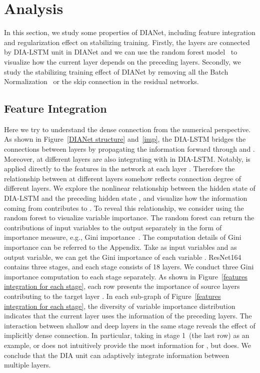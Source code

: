 \documentclass[letterpaper]{article} \usepackage{aaai20}  \usepackage{times}  \usepackage{helvet} \usepackage{courier}  \usepackage[hyphens]{url}  \usepackage{graphicx} \urlstyle{rm} \def\UrlFont{\rm}  \usepackage{graphicx}  \frenchspacing  \setlength{\pdfpagewidth}{8.5in}  \setlength{\pdfpageheight}{11in}  \usepackage{color}
\begin{document}
	\section{Analysis}
	\label{analysis}
	
	In this section, we study some properties of DIANet, including feature integration and regularization effect on stabilizing training. Firstly, the layers are connected by DIA-LSTM unit in DIANet and we can use the random forest model~\cite{Gregorutti2017Correlation} to visualize how the current layer depends on the preceding layers. Secondly, we study the stabilizing training effect of DIANet by removing all the Batch Normalization~\cite{Ioffe:2015:BNA:3045118.3045167} or the skip connection in the residual networks.
	
	\subsection{Feature Integration}
	Here we try to understand the dense connection from the numerical perspective. As shown in Figure~\ref{DIANet structure} and~\ref{imp}, the DIA-LSTM bridges the connections between layers by propagating the information forward through  and . Moreover,  at different layers are also integrating with  in DIA-LSTM. Notably,  is applied directly to the features in the network at each layer . Therefore the relationship between  at different layers somehow reflects connection degree of different layers. We explore the nonlinear relationship between the hidden state  of DIA-LSTM and the preceding hidden state , and visualize how the information coming from  contributes to . To reveal this relationship, we consider using the random forest to visualize variable importance. The random forest can return the contributions of input variables to the output separately in the form of importance measure, e.g., Gini importance~\cite{Gregorutti2017Correlation}. The computation details of Gini importance can be referred to the Appendix. Take  as input variables and  as output variable, we can get the Gini importance of each variable . ResNet164 contains three stages, and each stage consists of 18 layers. We conduct three Gini importance computation to each stage separately. As shown in Figure~\ref{features integration for each stage}, each row presents the importance of source layers  contributing to the target layer . In each sub-graph of Figure~\ref{features integration for each stage}, the diversity of variable importance distribution indicates that the current layer uses the information of the preceding layers. The interaction between shallow and deep layers in the same stage reveals the effect of implicitly dense connection. In particular, taking  in stage 1~(the last row) as an example,  or  does not intuitively provide the most information for , but  does. We conclude that the DIA unit can adaptively integrate information between multiple layers.
\end{document}
